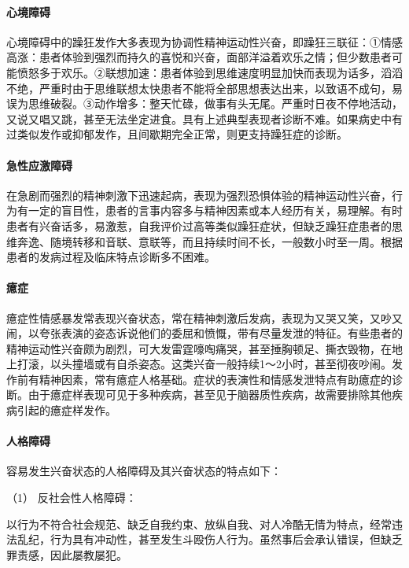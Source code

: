 \paragraph{心境障碍}

心境障碍中的躁狂发作大多表现为协调性精神运动性兴奋，即躁狂三联征：①情感高涨：患者体验到强烈而持久的喜悦和兴奋，面部洋溢着欢乐之情；但少数患者可能愤怒多于欢乐。②联想加速：患者体验到思维速度明显加快而表现为话多，滔滔不绝，严重时由于思维联想太快患者不能将全部思想表达出来，以致语不成句，易误为思维破裂。③动作增多：整天忙碌，做事有头无尾。严重时日夜不停地活动，又说又唱又跳，甚至无法坐定进食。具有上述典型表现者诊断不难。如果病史中有过类似发作或抑郁发作，且间歇期完全正常，则更支持躁狂症的诊断。

\paragraph{急性应激障碍}

在急剧而强烈的精神刺激下迅速起病，表现为强烈恐惧体验的精神运动性兴奋，行为有一定的盲目性，患者的言事内容多与精神因素或本人经历有关，易理解。有时患者有兴奋话多，易激惹，自我评价过高等类似躁狂症状，但缺乏躁狂症患者的思维奔逸、随境转移和音联、意联等，而且持续时间不长，一般数小时至一周。根据患者的发病过程及临床特点诊断多不困难。

\paragraph{癔症}

癔症性情感暴发常表现兴奋状态，常在精神刺激后发病，表现为又哭又笑，又吵又闹，以夸张表演的姿态诉说他们的委屈和愤慨，带有尽量发泄的特征。有些患者的精神运动性兴奋颇为剧烈，可大发雷霆嚎啕痛哭，甚至捶胸顿足、撕衣毁物，在地上打滚，以头撞墙或有自杀姿态。这类兴奋一般持续1～2小时，甚至彻夜吵闹。发作前有精神因素，常有癔症人格基础。症状的表演性和情感发泄特点有助癔症的诊断。由于癔症样表现可见于多种疾病，甚至见于脑器质性疾病，故需要排除其他疾病引起的癔症样发作。

\paragraph{人格障碍}

容易发生兴奋状态的人格障碍及其兴奋状态的特点如下：

\hypertarget{text00043.htmlux5cux23CHP1-18-1-2-5-1}{}
（1） 反社会性人格障碍：

以行为不符合社会规范、缺乏自我约束、放纵自我、对人冷酷无情为特点，经常违法乱纪，行为具有冲动性，甚至发生斗殴伤人行为。虽然事后会承认错误，但缺乏罪责感，因此屡教屡犯。

